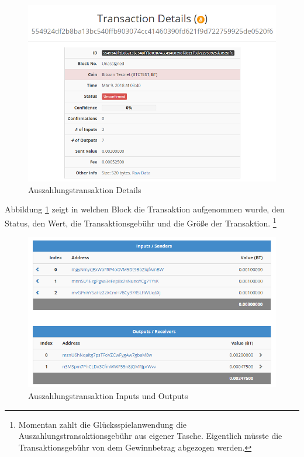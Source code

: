 \begin{figure}[H]
\centering
\includegraphics[width=1\linewidth]{Figures/btc_gui/btc_txn}
\decoRule
\caption{Auszahlungstransaktion Details}
\label{fig:btc_txn}
\end{figure}

Abbildung \ref{fig:btc_txn} zeigt in welchen Block die Transaktion aufgenommen wurde, den Status, den Wert, die Transaktionsgebühr und die Größe der Transaktion.
\footnote{Momentan zahlt die Glücksspielanwendung die Auszahlungstransaktionsgebühr aus eigener Tasche. Eigentlich müsste die Transaktionsgebühr von dem Gewinnbetrag abgezogen werden.}

\begin{figure}[H]
\centering
\includegraphics[width=1\linewidth]{Figures/btc_gui/btc_txn_input_output}
\decoRule
\caption{Auszahlungstransaktion Inputs und Outputs}
\label{fig:btc_txn_input_output}
\end{figure}



